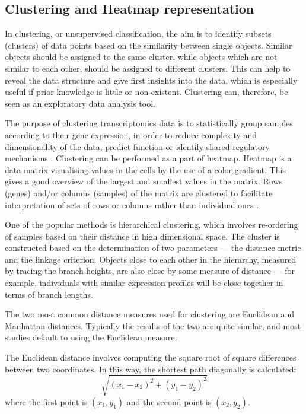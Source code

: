  
  
    \subsection{Clustering and Heatmap representation} \label{section:clustEDA}
    
    In clustering, or unsupervised classification, the aim is to identify subsets (clusters) of data points based on the similarity between single objects. Similar objects should be assigned to the same cluster, while objects which are not similar to each other, should be assigned to different clusters. This can help to reveal the data structure and give first insights into the data, which is especially useful if prior knowledge is little or non-existent. Clustering can, therefore, be seen as an exploratory data analysis tool. 
        
    The purpose of clustering transcriptomics data is to statistically group samples according to their gene expression, in order to reduce complexity and dimensionality of the data, predict function or identify shared regulatory mechanisms \cite{Metsalu2015ClustVis:Heatmap}. Clustering can be performed as a part of heatmap. Heatmap is a data matrix visualising values in the cells by the use of a color gradient. This gives a good overview of the largest and smallest values in the matrix. Rows (genes) and/or columns (samples) of the matrix are clustered to facilitate interpretation of sets of rows or columns rather than individual ones \cite{Metsalu2015ClustVis:Heatmap}.
    
    \newpage
    One of the popular methods is hierarchical clustering, which involves re-ordering of samples based on their distance in high dimensional space. The cluster is constructed based on the determination of two parameters — the distance metric and the linkage criterion. Objects close to each other in the hierarchy, measured by tracing the branch heights, are also close by some measure of distance — for example, individuals with similar expression profiles will be close together in terms of branch lengths.
    
    
    The two most common distance measures used for clustering are Euclidean and Manhattan distances. Typically the results of the two are quite similar, and most studies default to using the Euclidean measure. 
    
    The Euclidean distance involves computing the square root of square differences between two coordinates. In this way, the shortest path diagonally is calculated: $$ \sqrt{(x_{1}-x_{2})^{2}+(y_{1}-y_{2})^{2}}$$ where the first point is $(x_1, y_1)$ and the second point is $(x_2, y_2).$
    

